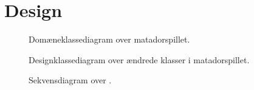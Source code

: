 \chapter{Design}\label{chap:Design}

\begin{figure}
\caption{Domæneklassediagram over matadorspillet.}\label{fig:DomainDia}
\centering

\end{figure}


\begin{figure}
\caption{Designklassediagram over ændrede klasser i matadorspillet.}\label{fig:DesignKlasseChanged}
\centering

\end{figure}


\begin{figure}
\caption{Sekvensdiagram over .}
\label{fig:SekvensLandOnField}
\centering

\end{figure}
